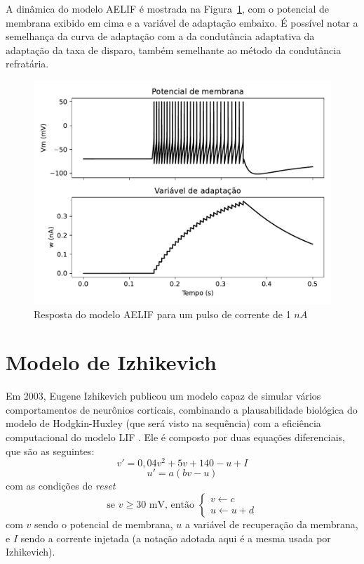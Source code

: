 A dinâmica do modelo AELIF é mostrada na Figura~\ref{fig:aelif}, com o potencial de membrana exibido em cima e a variável de adaptação embaixo. É possível notar a semelhança da curva de adaptação com a da condutância adaptativa da adaptação da taxa de disparo, também semelhante ao método da condutância refratária.

\begin{figure}[tb]
	\centering
	\caption[Resposta do modelo AELIF]{Resposta do modelo AELIF para um pulso de corrente de 1 $nA$}
	\label{fig:aelif}
	\includegraphics[width=0.7\linewidth]{figs/aelif}
\end{figure}

\section{Modelo de Izhikevich}\label{sec:izhikevich}
Em 2003, Eugene Izhikevich publicou um modelo capaz de simular vários comportamentos de neurônios corticais, combinando a plausabilidade biológica do modelo de Hodgkin-Huxley (que será visto na sequência) com a eficiência computacional do modelo LIF \cite{izhikevich_simple_2003}. Ele é composto por duas equações diferenciais, que são as seguintes:
\begin{equation}\label{eq:izhikevich_v}
	v'=0,04v^2+5v+140-u+I
\end{equation}
\begin{equation}\label{eq:izhikevich_u}
	u'=a(bv-u)
\end{equation}
com as condições de \textit{reset}
\begin{equation}\label{eq:izhikevich_condicao}
	\text{se }v\geq30\text{ mV,  então }\begin{cases}
		v\leftarrow c\\
		u\leftarrow u+d
	\end{cases}
\end{equation}
com $v$ sendo o potencial de membrana, $u$ a variável de recuperação da membrana, e $I$ sendo a corrente injetada (a notação adotada aqui é a mesma usada por Izhikevich).


